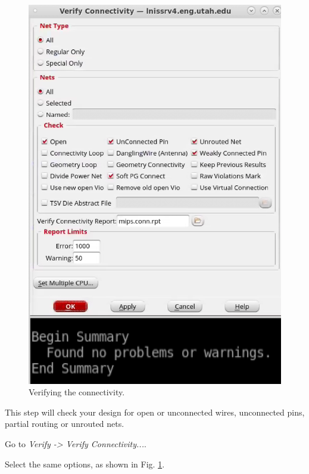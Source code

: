 \begin{enumerate}
	\parbox[t]{\dimexpr\textwidth-\leftmargin}{%
	\begin{figure}
		\vspace{-6mm}
		\centering
		\vspace{-\baselineskip}
		\includegraphics[scale=0.3]{figures/lab5_backend/verify_connect.pdf}
		\caption{Verifying the connectivity.}
		\label{verifyconnect}
	\end{figure}
This step will check your design for open or unconnected wires, unconnected pins, partial routing or unrouted nets.
	\item Go to \textit{Verify -> Verify Connectivity...}.
\item Select the same options, as shown in Fig. \ref{verifyconnect}.
}
\end{enumerate}
